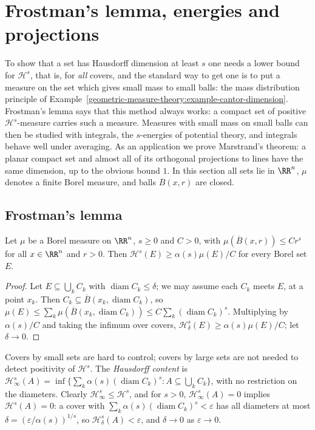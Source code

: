 \section{Frostman's lemma, energies and projections}\label{geometric-measure-theory:section-frostman}

To show that a set has Hausdorff dimension at least $s$ one needs a lower bound for $\mathcal{H}^s$, that is, for \emph{all} covers, and the standard way to get one is to put a measure on the set which
gives small mass to small balls: the mass distribution principle of Example~\ref{geometric-measure-theory:example-cantor-dimension}. Frostman's lemma says that this method always works: a compact set of
positive $\mathcal{H}^s$-measure carries such a measure. Measures with small mass on small balls can then be studied with integrals, the $s$-energies of potential theory, and integrals behave well under
averaging. As an application we prove Marstrand's theorem: a planar compact set and almost all of its orthogonal projections to lines have the same dimension, up to the obvious bound $1$. In this section
all sets lie in $\RR^n$, $\mu$ denotes a finite Borel measure, and balls $\overline{B}(x, r)$ are closed.

\subsection{Frostman's lemma}\label{geometric-measure-theory:subsection-frostman-lemma}

\begin{lemma}\label{geometric-measure-theory:lemma-mass-distribution}
Let $\mu$ be a Borel measure on $\RR^n$, $s \geq 0$ and $C > 0$, with $\mu(\overline{B}(x, r)) \leq Cr^s$ for all $x \in \RR^n$ and $r > 0$. Then $\mathcal{H}^s(E) \geq \alpha(s)\mu(E)/C$ for every Borel set $E$.
\end{lemma}

\begin{proof}
Let $E \subseteq \bigcup_kC_k$ with $\operatorname{diam}C_k \leq \delta$; we may assume each $C_k$ meets $E$, at a point $x_k$. Then $C_k \subseteq \overline{B}(x_k, \operatorname{diam}C_k)$, so
$\mu(E) \leq \sum_k\mu(\overline{B}(x_k, \operatorname{diam}C_k)) \leq C\sum_k(\operatorname{diam}C_k)^s$. Multiplying by $\alpha(s)/C$ and taking the infimum over covers,
$\mathcal{H}^s_\delta(E) \geq \alpha(s)\mu(E)/C$; let $\delta \to 0$.
\end{proof}

Covers by small sets are hard to control; covers by large sets are not needed to detect positivity of $\mathcal{H}^s$. The \emph{Hausdorff content} is
$\mathcal{H}^s_\infty(A) = \inf\{\sum_k\alpha(s)(\operatorname{diam}C_k)^s : A \subseteq \bigcup_kC_k\}$, with no restriction on the diameters. Clearly $\mathcal{H}^s_\infty \leq \mathcal{H}^s$, and for $s > 0$,
$\mathcal{H}^s_\infty(A) = 0$ implies $\mathcal{H}^s(A) = 0$: a cover with $\sum_k\alpha(s)(\operatorname{diam}C_k)^s < \varepsilon$ has all diameters at most $\delta = (\varepsilon/\alpha(s))^{1/s}$, so
$\mathcal{H}^s_\delta(A) < \varepsilon$, and $\delta \to 0$ as $\varepsilon \to 0$.

